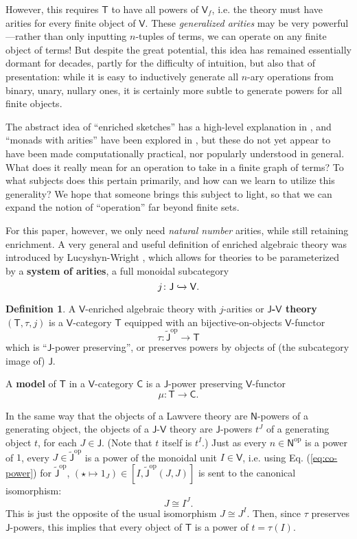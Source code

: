 \documentclass{amsart}
\theoremstyle{definition}
\newtheorem*{definition*}{Definition}
\newcommand{\NN}{\mathsf{N}}
\newcommand{\V}{\mathsf{V}}
\newcommand{\C}{\mathsf{C}}
\newcommand{\J}{\mathsf{J}}
\newcommand{\T}{\mathsf{T}}
\newcommand{\op}{\mathrm{op}}
\newcommand{\maps}{\colon}
\begin{document}
However, this requires $\T$ to have all powers of $\V_f$, i.e. the theory must have arities for every finite object of $\V$. These \textit{generalized arities} may be very powerful---rather than only inputting $n$-tuples of terms, we can operate on any finite object of terms! But despite the great potential, this idea has remained essentially dormant for decades, partly for the difficulty of intuition, but also that of presentation: while it is easy to inductively generate all $n$-ary operations from binary, unary, nullary ones, it is certainly more subtle to generate powers for all finite objects.

The abstract idea of ``enriched sketches'' has a high-level explanation in \cite{powsketch}, and ``monads with arities'' have been explored in \cite{mndarty}, but these do not yet appear to have been made computationally practical, nor popularly understood in general. What does it really mean for an operation to take in a finite graph of terms? To what subjects does this pertain primarily, and how can we learn to utilize this generality? We hope that someone brings this subject to light, so that we can expand the notion of ``operation'' far beyond finite sets.

For this paper, however, we only need \textit{natural number} arities, while still retaining enrichment. A very general and useful definition of enriched algebraic theory was introduced by Lucyshyn-Wright \cite{rbb}, which allows for theories to be parameterized by a \textbf{system of arities}, a full monoidal subcategory $$j\maps \J \xhookrightarrow{} \V.$$

\begin{definition*}
	A $\V$-enriched algebraic theory with $j$-arities or \textbf{$\J$-$\V$ theory} $(\T,\tau,j)$ is a $\V$-category $\T$ equipped with an bijective-on-objects $\V$-functor $$\tau\maps\tilde{\J}^\op \to \T$$ which is ``$\J$-power preserving'', or preserves powers by objects of (the subcategory image of) $\J$. \newline
\end{definition*}

A \textbf{model} of $\T$ in a $\V$-category $\C$ is a $\J$-power preserving $\V$-functor 
\[  \mu \maps \T \to \C.\]

In the same way that the objects of a Lawvere theory are $\NN$-powers of a generating object, the objects of a $\J$-$\V$ theory are $\J$-powers $t^J$ of a generating object $t$, for each $J \in \J$. (Note that $t$ itself is $t^I$.)  Just as every $n\in \NN^\op$ is a power of $1$, every $J\in \tilde{\J}^{\op}$ is a power of the monoidal unit $I\in \V$, i.e. using Eq. (\ref{eq:co-power}) for $\tilde{\J}^{\op}$, $(\star \mapsto 1_J) \in [I,\tilde{\J}^{\op}(J,J)]$ is sent to the canonical isomorphism:
\begin{equation}
J \cong I^J.
\end{equation}
This is just the opposite of the usual isomorphism $J \cong J^I$. Then, since $\tau$ preserves $\J$-powers, this implies that every object of $\T$ is a power of $t = \tau(I)$.
\end{document}
